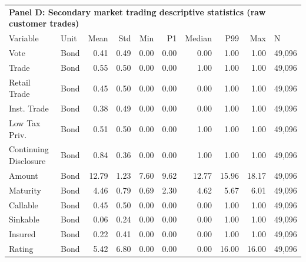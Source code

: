 \begin{table}[H]
\centering
\begin{tabular*}{\textwidth}{@{\extracolsep{\fill}}llrrrrrrrl}
\multicolumn{10}{l}{\textbf{Panel D: Secondary market trading descriptive statistics (raw customer trades)}}\\

\addlinespace
  \toprule
Variable & Unit & Mean & Std & Min & P1 & Median & P99 & Max & N \\ 
  \hline
Vote & Bond & 0.41 & 0.49 & 0.00 & 0.00 & 0.00 & 1.00 & 1.00 & 49,096 \\ 
  Trade & Bond & 0.55 & 0.50 & 0.00 & 0.00 & 1.00 & 1.00 & 1.00 & 49,096 \\ 
  Retail Trade & Bond & 0.45 & 0.50 & 0.00 & 0.00 & 0.00 & 1.00 & 1.00 & 49,096 \\ 
  Inst. Trade & Bond & 0.38 & 0.49 & 0.00 & 0.00 & 0.00 & 1.00 & 1.00 & 49,096 \\ 
  Low Tax Priv. & Bond & 0.51 & 0.50 & 0.00 & 0.00 & 1.00 & 1.00 & 1.00 & 49,096 \\ 
  Continuing Disclosure & Bond & 0.84 & 0.36 & 0.00 & 0.00 & 1.00 & 1.00 & 1.00 & 49,096 \\ 
  Amount & Bond & 12.79 & 1.23 & 7.60 & 9.62 & 12.77 & 15.96 & 18.17 & 49,096 \\ 
  Maturity & Bond & 4.46 & 0.79 & 0.69 & 2.30 & 4.62 & 5.67 & 6.01 & 49,096 \\ 
  Callable & Bond & 0.45 & 0.50 & 0.00 & 0.00 & 0.00 & 1.00 & 1.00 & 49,096 \\ 
  Sinkable & Bond & 0.06 & 0.24 & 0.00 & 0.00 & 0.00 & 1.00 & 1.00 & 49,096 \\ 
  Insured & Bond & 0.22 & 0.41 & 0.00 & 0.00 & 0.00 & 1.00 & 1.00 & 49,096 \\ 
  Rating & Bond & 5.42 & 6.80 & 0.00 & 0.00 & 0.00 & 16.00 & 16.00 & 49,096 \\ 
   \hline
\end{tabular*}
\end{table}
